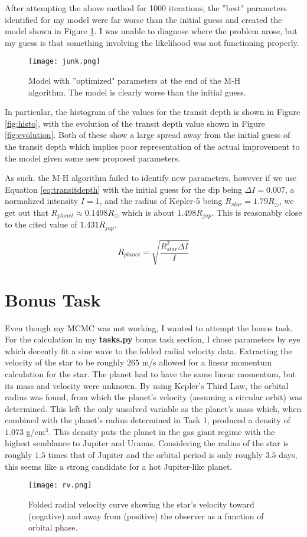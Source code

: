 \documentclass{article}
\begin{document}
After attempting the above method for 1000 iterations, the ''best" parameters identified for my model were far worse than the initial guess and created the model shown in Figure \ref{fig:junk}. I was unable to diagnose where the problem arose, but my guess is that something involving the likelihood was not functioning properly.

\begin{figure}[ht!]
\texttt{[image: junk.png]}
\caption{Model with ''optimized" parameters at the end of the M-H algorithm. The model is clearly worse than the initial guess.}
\label{fig:junk}
\end{figure}

In particular, the histogram of the values for the transit depth is shown in Figure \ref{fig:histo}, with the evolution of the transit depth value shown in Figure \ref{fig:evolution}. Both of these show a large spread away from the initial guess of the transit depth which implies poor representation of the actual improvement to the model given some new proposed parameters.

As such, the M-H algorithm failed to identify new parameters, however if we use Equation \ref{eq:transitdepth} with the initial guess for the dip being $\Delta I = 0.007$, a normalized intensity $I = 1$, and the radius of Kepler-5 being $R_{star} = 1.79 R_\odot$, we get out that $R_{planet} \approx 0.1498 R_\odot$ which is about $1.498 R_{jup}$. This is reasonably close to the cited value of $1.431 R_{jup}$.

\begin{equation}
R_{planet} = \sqrt{\frac{R_{star}^2 \Delta I}{I}}
\label{eq:transitdepth}
\end{equation}

\FloatBarrier

\section{Bonus Task}

Even though my MCMC was not working, I wanted to attempt the bonus task. For the calculation in my \textbf{tasks.py} bonus task section, I chose parameters by eye which decently fit a sine wave to the folded radial velocity data. Extracting the velocity of the star to be roughly $265$ m/s allowed for a linear momentum calculation for the star. The planet had to have the same linear momentum, but its mass and velocity were unknown. By using Kepler's Third Law, the orbital radius was found, from which the planet's velocity (assuming a circular orbit) was determined. This left the only unsolved variable as the planet's mass which, when combined with the planet's radius determined in Task 1, produced a density of $1.073$ g/cm$^3$. This density puts the planet in the gas giant regime with the highest semblance to Jupiter and Uranus. Considering the radius of the star is roughly $1.5$ times that of Jupiter and the orbital period is only roughly $3.5$ days, this seems like a strong candidate for a hot Jupiter-like planet. 

\begin{figure}[ht!]
\texttt{[image: rv.png]}
\caption{Folded radial velocity curve showing the star's velocity toward (negative) and away from (positive) the observer as a function of orbital phase.}
\label{fig:rv}
\end{figure}
\end{document}
